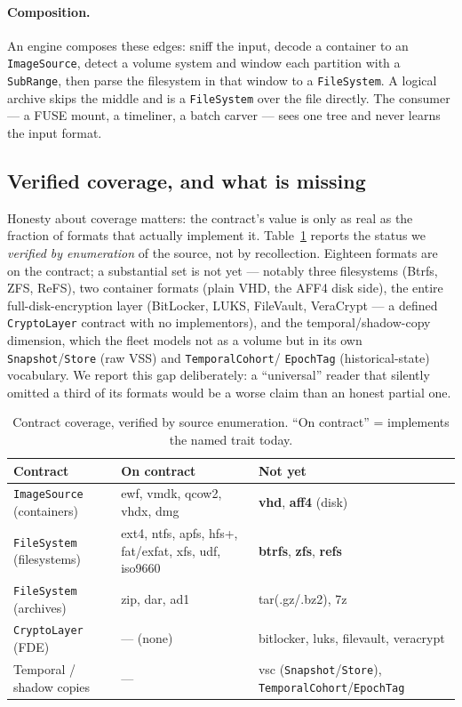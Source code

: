 \documentclass[10pt,twocolumn]{article}
\begin{document}
\paragraph{Composition.}
An engine composes these edges: sniff the input, decode a container to an
\texttt{ImageSource}, detect a volume system and window each partition with a
\texttt{SubRange}, then parse the filesystem in that window to a \texttt{FileSystem}.
A logical archive skips the middle and is a \texttt{FileSystem} over the file
directly. The consumer --- a FUSE mount, a timeliner, a batch carver --- sees one
tree and never learns the input format.

\subsection{Verified coverage, and what is missing}\label{sec:coverage}

Honesty about coverage matters: the contract's value is only as real as the
fraction of formats that actually implement it. Table~\ref{tab:coverage} reports
the status we \emph{verified by enumeration} of the source, not by recollection.
Eighteen formats are on the contract; a substantial set is not yet --- notably
three filesystems (Btrfs, ZFS, ReFS), two container formats (plain VHD, the AFF4
disk side), the entire full-disk-encryption layer (BitLocker, LUKS, FileVault,
VeraCrypt --- a defined \texttt{CryptoLayer} contract with no implementors), and
the temporal/shadow-copy dimension, which the fleet models not as a volume but in
its own \texttt{Snapshot}/\texttt{Store} (raw VSS) and \texttt{TemporalCohort}/
\texttt{EpochTag} (historical-state) vocabulary. We report this gap deliberately:
a ``universal'' reader that silently omitted a third of its formats would be a
worse claim than an honest partial one.

\begin{table}[t]\centering\small
\caption{Contract coverage, verified by source enumeration. ``On contract'' =
implements the named trait today.}\label{tab:coverage}
\begin{tabular}{@{}llp{3.3cm}@{}}
\toprule
Contract & On contract & Not yet \\
\midrule
\texttt{ImageSource} (containers) & ewf, vmdk, qcow2, vhdx, dmg & \textbf{vhd}, \textbf{aff4} (disk) \\
\texttt{FileSystem} (filesystems) & ext4, ntfs, apfs, hfs+, fat/exfat, xfs, udf, iso9660 & \textbf{btrfs}, \textbf{zfs}, \textbf{refs} \\
\texttt{FileSystem} (archives) & zip, dar, ad1 & tar(.gz/.bz2), 7z \\
\texttt{CryptoLayer} (FDE) & --- (none) & bitlocker, luks, filevault, veracrypt \\
Temporal / shadow copies & --- & vsc (\texttt{Snapshot}/\texttt{Store}), \texttt{TemporalCohort}/\texttt{EpochTag} \\
\bottomrule
\end{tabular}
\end{table}
\end{document}
